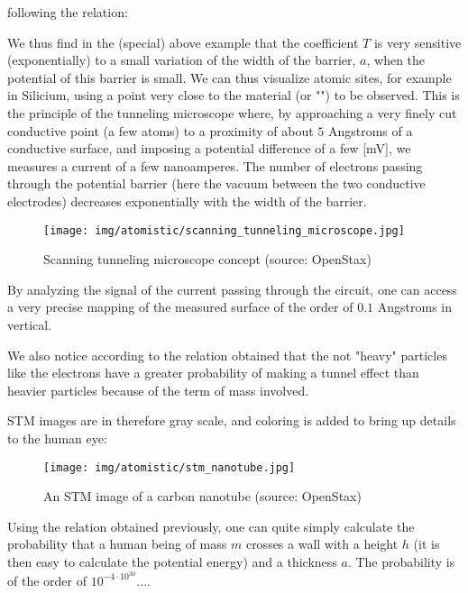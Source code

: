 	\begin{tcolorbox}[colframe=black,colback=white,sharp corners]
	following the relation:
	
	\end{tcolorbox}
	
	We thus find in the (special) above example that the coefficient $T$ is very sensitive (exponentially) to a small variation of the width of the barrier, $a$, when the potential of this barrier is small. We can thus visualize atomic sites, for example in Silicium, using a point very close to the material (or "") to be observed. This is the principle of the tunneling microscope where, by approaching a very finely cut conductive point (a few atoms) to a proximity of about $5$ Angstroms of a conductive surface, and imposing a potential difference of a few [mV], we measures a current of a few nanoamperes. The number of electrons passing through the potential barrier (here the vacuum between the two conductive electrodes) decreases exponentially with the width of the barrier.
	\begin{figure}[H]
		\centering
		\texttt{[image: img/atomistic/scanning\_tunneling\_microscope.jpg]}	
		\caption{Scanning tunneling microscope concept (source: OpenStax)}
	\end{figure}
	By analyzing the signal of  the current passing through the circuit, one can access a very precise mapping of the measured surface of the order of $0.1$ Angstroms in vertical.
	
	We also notice according to the relation obtained that the not "heavy" particles like the electrons have a greater probability of making a tunnel effect than heavier particles because of the term of mass involved.
	
	STM images are in therefore gray scale, and coloring is added to bring up details to the human eye:
	\begin{figure}[H]
		\centering
		\texttt{[image: img/atomistic/stm\_nanotube.jpg]}	
		\caption{An STM image of a carbon nanotube (source: OpenStax)}
	\end{figure}

	Using the relation obtained previously, one can quite simply calculate the probability that a human being of mass $m$ crosses a wall with a height $h$ (it is then easy to calculate the potential energy) and a thickness $a$. The probability is of the order of $10^{-4\cdot 10^{30}}$....

